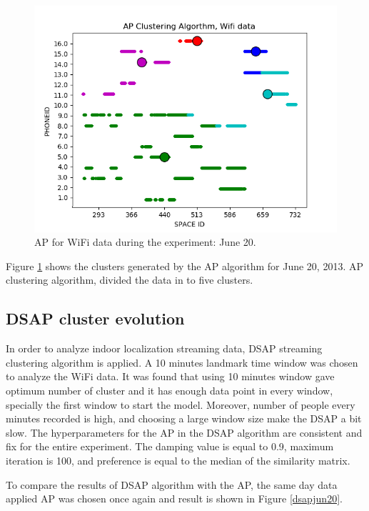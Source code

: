 \begin{figure}[!h]
    \centering
    \includegraphics[width = 10 cm]{image/Chapters/Chapter6/APJune20.png}
    \caption{ AP for WiFi data during the experiment: June 20.}
    \label{APUjoneday}
\end{figure}


Figure \ref{APUjoneday} shows the clusters generated by the AP algorithm for June 20, 2013. AP clustering algorithm, divided the data in to five clusters.







\subsection{DSAP cluster evolution}
In order to analyze indoor localization streaming data, DSAP streaming clustering algorithm is applied. A 10 minutes landmark time window was chosen to analyze the WiFi data. It was found that using 10 minutes window gave optimum number of cluster and it has enough data point in every window, specially the first window to start the model. Moreover, number of people every minutes recorded is high, and choosing a large window size make the DSAP a bit slow. The hyperparameters for the AP in the DSAP algorithm are consistent and fix for the entire experiment. The damping value is equal to 0.9, maximum iteration is 100, and preference is equal to the median of the similarity matrix. 

To compare the results of DSAP algorithm with the AP, the same day data applied AP was chosen once again and result is shown in Figure \ref{dsapjun20}.




